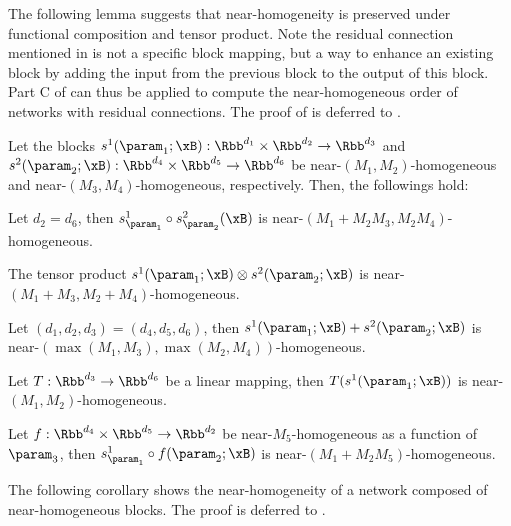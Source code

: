 The following lemma suggests that near-homogeneity is preserved under functional composition and tensor product. Note the residual connection mentioned in  is not a specific block mapping, but a way to enhance an existing block by adding the input from the previous block to the output of this block. Part C of  can thus be applied to compute the near-homogeneous order of networks with residual connections.
The proof of   is deferred to . 
\begin{lemma}
\label{prop: Composition of block mappings}
Let the blocks $s^1(\param_1;\xB): \Rbb^{d_1} \times \Rbb^{d_2} \to \Rbb^{d_3}$ and $s^2(\param_2;\xB): \Rbb^{d_4} \times \Rbb^{d_5} \to \Rbb^{d_6}$ be near-$(M_1, M_2)$-homogeneous and near-$(M_3, M_4)$-homogeneous, respectively.
Then, the followings hold:
\begin{assumpenum}
\item Let $d_2 = d_6$, then $s^1_{\param_1} \circ s^2_{\param_2}(\xB)$ is near-$(M_1 + M_2M_3, M_2M_4)$-homogeneous. 
\item The tensor product $ s^1(\param_1;\xB) \otimes s^2(\param_2;\xB)$ is %
near-$(M_1 + M_3, M_2 + M_4)$-homogeneous. 
\item Let $(d_1, d_2, d_3) = (d_4, d_5, d_6)$, then $ s^1(\param_1;\xB) + s^2(\param_2;\xB)$ is
near-$(\max(M_1, M_3), \max(M_2, M_4))$-homogeneous.
\item Let $T: \Rbb^{d_3} \to \Rbb^{d_6}$ be a linear mapping, then $T(s^1(\param_1;\xB))$ is 
near-$(M_1, M_2)$-homogeneous. 
\item Let $f: \Rbb^{d_4} \times \Rbb^{d_5} \to \Rbb^{d_2}$ be near-$M_5$-homogeneous as a function of $\param_3$, then
$s^1_{\param_1} \circ f(\param_2;\xB)$ is near-$(M_1+ M_2 M_5)$-homogeneous. 
\end{assumpenum}
\end{lemma}
The following corollary shows the near-homogeneity of a network composed of near-homogeneous blocks. The proof is deferred to . 

